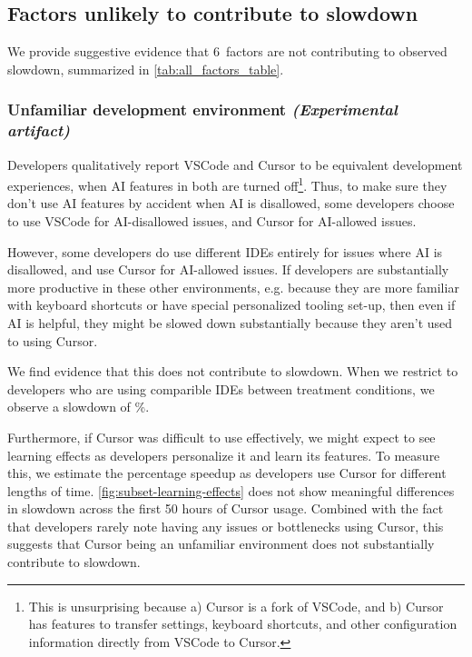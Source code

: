 \documentclass{article}
\newcommand{\NumFactorsThatDoNotContribute}{6}
\begin{document}
\subsection{Factors unlikely to contribute to slowdown}
\label{sec:factorsnotdriving}


We provide suggestive evidence that \NumFactorsThatDoNotContribute\ factors are not contributing to observed slowdown, summarized in \autoref{tab:all_factors_table}.

\subsubsection{Unfamiliar development environment \textnormal{\textit{(Experimental artifact)}}}
\label{sec:factor-unfamiliar-dev-environment}

Developers qualitatively report VSCode and Cursor to be equivalent development experiences, when AI features in both are turned off\footnote{This is unsurprising because a) Cursor is a fork of VSCode, and b) Cursor has features to transfer settings, keyboard shortcuts, and other configuration information directly from VSCode to Cursor.}. Thus, to make sure they don't use AI features by accident when AI is disallowed, some developers choose to use VSCode for AI-disallowed issues, and Cursor for AI-allowed issues.

However, some developers do use different IDEs entirely for issues where AI is disallowed, and use Cursor for AI-allowed issues. If developers are substantially more productive in these other environments, e.g. because they are more familiar with keyboard shortcuts or have special personalized tooling set-up, then even if AI is helpful, they might be slowed down substantially because they aren't used to using Cursor.

We find evidence that this does not contribute to slowdown. When we restrict to developers who are using comparible IDEs between treatment conditions, we observe a slowdown of \PctSpeedupUsedComparableIDEs\%.

 

Furthermore, if Cursor was difficult to use effectively, we might expect to see learning effects as developers personalize it and learn its features. To measure this, we estimate the percentage speedup as developers use Cursor for different lengths of time. \autoref{fig:subset-learning-effects} does not show meaningful differences in slowdown across the first 50 hours of Cursor usage. Combined with the fact that developers rarely note having any issues or bottlenecks using Cursor, this suggests that Cursor being an unfamiliar environment does not substantially contribute to slowdown.
\end{document}
